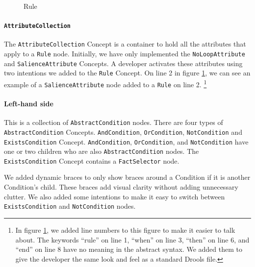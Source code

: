 \begin{figure}[H]
    \centering
    \caption{Rule}
    \label{fig:Rule}
\end{figure}

\paragraph{\texttt{AttributeCollection}} The \texttt{AttributeCollection} Concept is a container to hold all the attributes that apply to a \texttt{Rule} node.
Initially, we have only implemented the \texttt{NoLoopAttribute} and \texttt{SalienceAttribute} Concepts.
A developer activates these attributes using two intentions we added to the \texttt{Rule} Concept.
On line 2 in figure \ref{fig:Rule}, we can see an example of a \texttt{SalienceAttribute} node added to a \texttt{Rule} on line 2.
\footnote{In figure \ref{fig:Rule}, we added line numbers to this figure to make it easier to talk about.
The keywords ``rule'' on line 1, ``when'' on line 3, ``then'' on line 6, and ``end'' on line 8 have no meaning in the abstract syntax.
We added them to give the developer the same look and feel as a standard Drools file.}

\paragraph{Left-hand side} This is a collection of \texttt{AbstractCondition} nodes.
There are four types of \texttt{AbstractCondition} Concepts.
\texttt{AndCondition}, \texttt{OrCondition}, \texttt{NotCondition} and \texttt{ExistsCondition} Concept.
\texttt{AndCondition}, \texttt{OrCondition}, and \texttt{NotCondition} have one or two children who are also \texttt{AbstractCondition} nodes.
The \texttt{ExistsCondition} Concept contains a \texttt{FactSelector} node.

We added dynamic braces to only show braces around a Condition if it is another Condition's child. 
These braces add visual clarity without adding unnecessary clutter.
We also added some intentions to make it easy to switch between \texttt{ExistsCondition} and \texttt{NotCondition} nodes.

